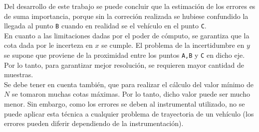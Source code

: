 
	Del desarrollo de este trabajo se puede concluir que la estimación de los errores es de suma importancia, porque sin la correción realizada se hubiese confundido la llegada al punto \texttt{B} cuando en realidad se el vehículo en el punto \texttt{C}.\\

	En cuanto a las limitaciones dadas por el poder de cómputo, se garantiza que la cota dada por le incerteza en $x$ se cumple. El problema de la incertidumbre en $y$ se supone que proviene de la proximidad entre los puntos \texttt{A,B} y \texttt{C} en dicho eje. Por lo tanto, para garantizar mejor resolución, se requieren mayor cantidad de muestras.\\

	Se debe tener en cuenta también, que para realizar el cálculo del valor mínimo de $N$ se tomaron muchas cotas máximas. Por lo tanto, dicho valor puede ser mucho menor. Sin embargo, como los errores se deben al instrumental utilizado, no se puede aplicar esta técnica a cualquier problema de trayectoria de un vehículo (los errores pueden diferir dependiendo de la instrumentación).


